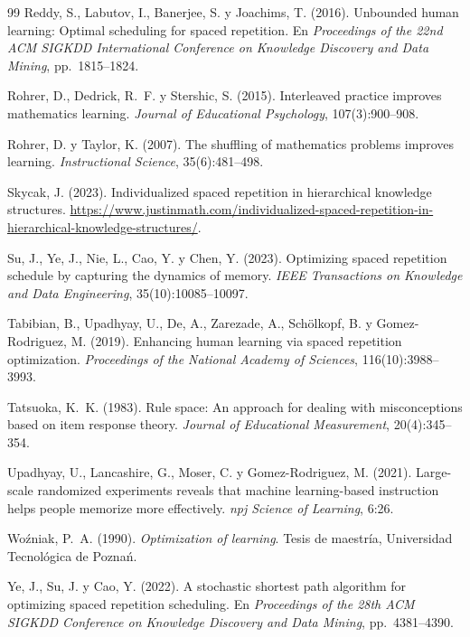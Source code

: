 \documentclass[11pt]{article}
\theoremstyle{definition}
\theoremstyle{remark}
\begin{document}
\begin{thebibliography}{99}
Reddy, S., Labutov, I., Banerjee, S. y Joachims, T. (2016).
\newblock Unbounded human learning: Optimal scheduling for spaced repetition.
\newblock En \emph{Proceedings of the 22nd ACM SIGKDD International Conference on Knowledge Discovery and Data Mining}, pp.~1815--1824.

Rohrer, D., Dedrick, R.~F. y Stershic, S. (2015).
\newblock Interleaved practice improves mathematics learning.
\newblock \emph{Journal of Educational Psychology}, 107(3):900--908.

Rohrer, D. y Taylor, K. (2007).
\newblock The shuffling of mathematics problems improves learning.
\newblock \emph{Instructional Science}, 35(6):481--498.

Skycak, J. (2023).
\newblock Individualized spaced repetition in hierarchical knowledge structures.
\newblock \url{https://www.justinmath.com/individualized-spaced-repetition-in-hierarchical-knowledge-structures/}.

Su, J., Ye, J., Nie, L., Cao, Y. y Chen, Y. (2023).
\newblock Optimizing spaced repetition schedule by capturing the dynamics of memory.
\newblock \emph{IEEE Transactions on Knowledge and Data Engineering}, 35(10):10085--10097.

Tabibian, B., Upadhyay, U., De, A., Zarezade, A., Schölkopf, B. y Gomez-Rodriguez, M. (2019).
\newblock Enhancing human learning via spaced repetition optimization.
\newblock \emph{Proceedings of the National Academy of Sciences}, 116(10):3988--3993.

Tatsuoka, K.~K. (1983).
\newblock Rule space: An approach for dealing with misconceptions based on item response theory.
\newblock \emph{Journal of Educational Measurement}, 20(4):345--354.

Upadhyay, U., Lancashire, G., Moser, C. y Gomez-Rodriguez, M. (2021).
\newblock Large-scale randomized experiments reveals that machine learning-based instruction helps people memorize more effectively.
\newblock \emph{npj Science of Learning}, 6:26.

Woźniak, P.~A. (1990).
\newblock \emph{Optimization of learning}.
\newblock Tesis de maestría, Universidad Tecnológica de Poznań.

Ye, J., Su, J. y Cao, Y. (2022).
\newblock A stochastic shortest path algorithm for optimizing spaced repetition scheduling.
\newblock En \emph{Proceedings of the 28th ACM SIGKDD Conference on Knowledge Discovery and Data Mining}, pp.~4381--4390.

\end{thebibliography}
\end{document}
